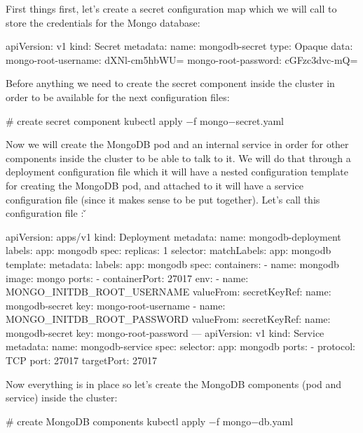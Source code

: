 First things first, let's create a secret configuration map which we will call  to store the
credentials for the Mongo database:

\begin{block}
apiVersion: v1
kind: Secret
metadata:
    name: mongodb-secret
type: Opaque
data:
    mongo-root-username: dXNl-cm5hbWU=
    mongo-root-password: cGFzc3dvc-mQ=
\end{block}

Before anything we need to create the secret component inside the cluster in order to be available for the next
configuration files:

\begin{bash}
# create secret component
kubectl apply $-$f mongo$-$secret.yaml
\end{bash}

Now we will create the MongoDB pod and an internal service in order for other components inside the cluster to be
able to talk to it. We will do that through a deployment configuration file which it will have a nested configuration
template for creating the MongoDB pod, and attached to it will have a service configuration file (since it makes
sense to be put together). Let's call this configuration file : \v

\begin{block}
apiVersion: apps/v1
kind: Deployment
metadata:
  name: mongodb-deployment
  labels:
    app: mongodb
spec:
  replicas: 1
  selector:
    matchLabels:
      app: mongodb
  template:
    metadata:
      labels:
        app: mongodb
    spec:
      containers:
      - name: mongodb
        image: mongo
        ports:
        - containerPort: 27017
        env:
        - name: MONGO_INITDB_ROOT_USERNAME
          valueFrom:
            secretKeyRef:
              name: mongodb-secret
              key: mongo-root-username
        - name: MONGO_INITDB_ROOT_PASSWORD
          valueFrom:
            secretKeyRef:
              name: mongodb-secret
              key: mongo-root-password
---
apiVersion: v1
kind: Service
metadata:
  name: mongodb-service
spec:
  selector:
    app: mongodb
  ports:
    - protocol: TCP
      port: 27017
      targetPort: 27017
\end{block}

Now everything is in place so let's create the MongoDB components (pod and service) inside the cluster:

\begin{bash}
# create MongoDB components
kubectl apply $-$f mongo$-$db.yaml
\end{bash}

